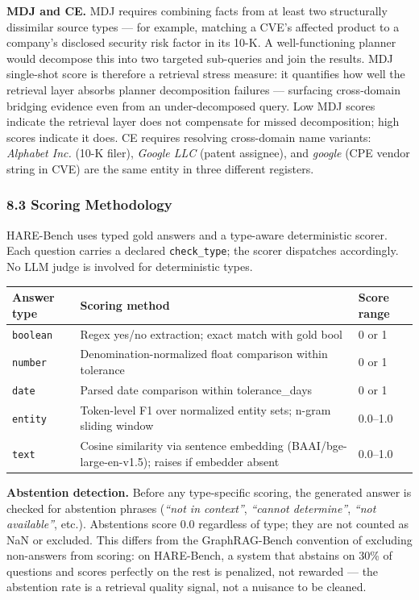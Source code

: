 \documentclass[
]{article}
\begin{document}
\textbf{MDJ and CE.} MDJ requires combining facts from at least two
structurally dissimilar source types --- for example, matching a CVE's
affected product to a company's disclosed security risk factor in its
10-K. A well-functioning planner would decompose this into two targeted
sub-queries and join the results. MDJ single-shot score is therefore a
retrieval stress measure: it quantifies how well the retrieval layer
absorbs planner decomposition failures --- surfacing cross-domain
bridging evidence even from an under-decomposed query. Low MDJ scores
indicate the retrieval layer does not compensate for missed
decomposition; high scores indicate it does. CE requires resolving
cross-domain name variants: \emph{Alphabet Inc.} (10-K filer),
\emph{Google LLC} (patent assignee), and \emph{google} (CPE vendor
string in CVE) are the same entity in three different registers.

\subsubsection{8.3 Scoring Methodology}\label{scoring-methodology}

HARE-Bench uses typed gold answers and a type-aware deterministic
scorer. Each question carries a declared \texttt{check\_type}; the
scorer dispatches accordingly. No LLM judge is involved for
deterministic types.

\begin{small}
\setlength{\tabcolsep}{4pt}
\begin{longtable}{p{0.8in}p{4.0in}p{1.0in}}
\toprule
\textbf{Answer type} & \textbf{Scoring method} & \textbf{Score range} \\
\midrule
\endhead
\texttt{boolean} & Regex yes/no extraction; exact match with gold bool & 0 or 1 \\
\texttt{number} & Denomination-normalized float comparison within tolerance & 0 or 1 \\
\texttt{date} & Parsed date comparison within tolerance\_days & 0 or 1 \\
\texttt{entity} & Token-level F1 over normalized entity sets; n-gram sliding window & 0.0--1.0 \\
\texttt{text} & Cosine similarity via sentence embedding (BAAI/bge-large-en-v1.5); raises if embedder absent & 0.0--1.0 \\
\bottomrule
\end{longtable}
\end{small}

\textbf{Abstention detection.} Before any type-specific scoring, the
generated answer is checked for abstention phrases (\emph{``not in
context''}, \emph{``cannot determine''}, \emph{``not available''},
etc.). Abstentions score 0.0 regardless of type; they are not counted as
NaN or excluded. This differs from the GraphRAG-Bench convention of
excluding non-answers from scoring: on HARE-Bench, a system that
abstains on 30\% of questions and scores perfectly on the rest is
penalized, not rewarded --- the abstention rate is a retrieval quality
signal, not a nuisance to be cleaned.
\end{document}
